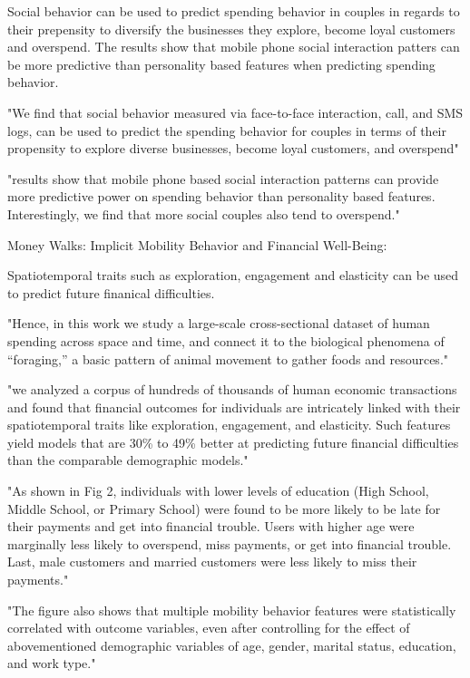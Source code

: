 {Social behavior can be used to predict spending behavior in couples in regards to their prepensity to diversify the businesses they explore, become loyal customers and overspend. The results show that mobile phone social interaction patters can be more predictive than personality based features when predicting spending behavior. 

"We find that social behavior measured via face-to-face interaction, call, and SMS logs, can be used to predict the spending behavior for couples in terms of their propensity to explore diverse businesses, become loyal customers, and overspend"

"results show that mobile phone based social interaction patterns can provide more predictive power on spending behavior than personality based features. Interestingly, we find that more social couples also tend to overspend."




Money Walks: Implicit Mobility Behavior and Financial Well-Being:

Spatiotemporal traits such as exploration, engagement and elasticity can be used to predict future finanical difficulties. 

"Hence, in this work we study a large-scale cross-sectional dataset of human spending across space and time, and connect it to the biological phenomena of “foraging,” a basic pattern of animal movement to gather foods and resources."

"we analyzed a corpus of hundreds of thousands of human economic transactions and found that financial outcomes for individuals are intricately linked with their spatiotemporal traits like exploration, engagement, and elasticity. Such features yield models that are 30\% to 49\% better at predicting future financial difficulties than the comparable demographic models."

"As shown in Fig 2, individuals with lower levels of education (High School, Middle School, or Primary School) were found to be more likely to be late for their payments and get into financial trouble. Users with higher age were marginally less likely to overspend, miss payments, or get into financial trouble. Last, male customers and married customers were less likely to miss their payments."

"The figure also shows that multiple mobility behavior features were statistically correlated with outcome variables, even after controlling for the effect of abovementioned demographic variables of age, gender, marital status, education, and work type."

}
